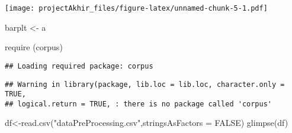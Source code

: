 \documentclass[
]{article}
\newenvironment{Shaded}{\begin{snugshade}}{\end{snugshade}}
\newcommand{\AttributeTok}[1]{\textcolor[rgb]{0.77,0.63,0.00}{#1}}
\newcommand{\CommentTok}[1]{\textcolor[rgb]{0.56,0.35,0.01}{\textit{#1}}}
\newcommand{\ConstantTok}[1]{\textcolor[rgb]{0.00,0.00,0.00}{#1}}
\newcommand{\DecValTok}[1]{\textcolor[rgb]{0.00,0.00,0.81}{#1}}
\newcommand{\FunctionTok}[1]{\textcolor[rgb]{0.00,0.00,0.00}{#1}}
\newcommand{\NormalTok}[1]{#1}
\newcommand{\OtherTok}[1]{\textcolor[rgb]{0.56,0.35,0.01}{#1}}
\newcommand{\SpecialCharTok}[1]{\textcolor[rgb]{0.00,0.00,0.00}{#1}}
\newcommand{\StringTok}[1]{\textcolor[rgb]{0.31,0.60,0.02}{#1}}
\begin{document}
\begin{Shaded}
\end{Shaded}

\texttt{[image: projectAkhir\_files/figure-latex/unnamed-chunk-5-1.pdf]}

\begin{Shaded}
\begin{Highlighting}[]
\NormalTok{barplt }\OtherTok{\textless{}{-}}\NormalTok{ a}
\end{Highlighting}
\end{Shaded}

\begin{Shaded}
\begin{Highlighting}[]
\FunctionTok{require}\NormalTok{ (corpus)}
\end{Highlighting}
\end{Shaded}

\begin{verbatim}
## Loading required package: corpus
\end{verbatim}

\begin{verbatim}
## Warning in library(package, lib.loc = lib.loc, character.only = TRUE,
## logical.return = TRUE, : there is no package called 'corpus'
\end{verbatim}

\begin{Shaded}
\begin{Highlighting}[]
\NormalTok{df}\OtherTok{\textless{}{-}}\FunctionTok{read.csv}\NormalTok{(}\StringTok{"dataPreProcessing.csv"}\NormalTok{,}\AttributeTok{stringsAsFactors =} \ConstantTok{FALSE}\NormalTok{)}
\FunctionTok{glimpse}\NormalTok{(df)}
\end{Highlighting}
\end{Shaded}
\end{document}
